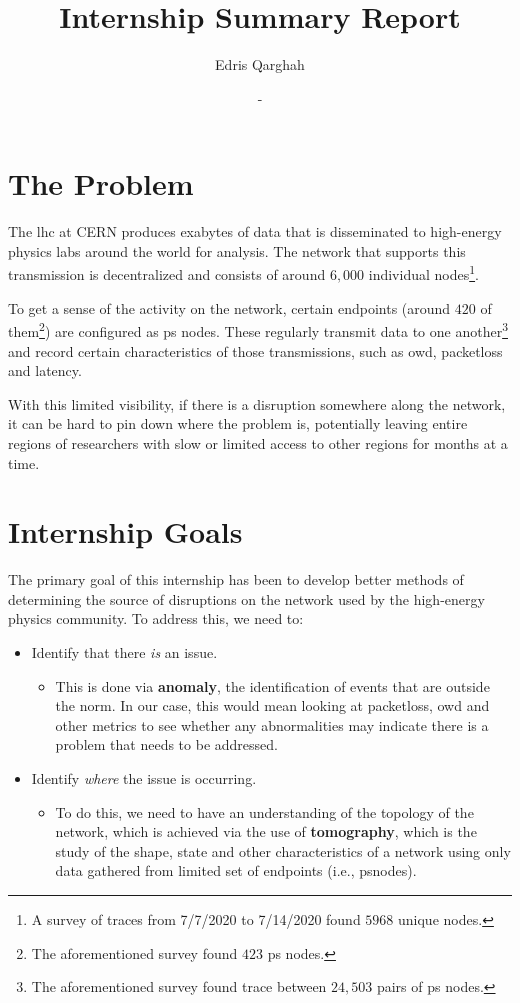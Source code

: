 \documentclass{finalreport}
\title{Internship Summary Report}
\author{Edris Qarghah}
\date{\DTMusedate{startdate}-\DTMusedate{enddate}}
\begin{document}
\maketitle

\newpage

\section*{The Problem}

The \gls{lhc} at CERN produces exabytes of data that is disseminated to high-energy physics labs around the world for analysis. The network that supports this transmission is decentralized and consists of around $6,000$ individual \glspl{node}\footnote{A survey of \glspl{trace} from 7/7/2020 to 7/14/2020 found $5968$ unique \glspl{node}.}.

To get a sense of the activity on the network, certain \glspl{endpoint} (around $420$ of them\footnote{The aforementioned survey found $423$ \gls{ps} nodes.}) are configured as \gls{ps} nodes. These regularly transmit data to one another\footnote{The aforementioned survey found \gls{trace} between $24,503$ pairs of \gls{ps} nodes.} and record certain characteristics of those transmissions, such as \gls{owd}, \gls{packetloss} and \gls{latency}. 

With this limited visibility, if there is a disruption somewhere along the network, it can be hard to pin down where the problem is, potentially leaving entire regions of researchers with slow or limited access to other regions for months at a time.


\section*{Internship Goals}

The primary goal of this internship has been to develop better methods of determining the source of disruptions on the network used by the high-energy physics community. To address this, we need to:

\begin{itemize}
	\item Identify that there \textit{is} an issue. 
	\begin{itemize}
		\item This is done via \textbf{\gls{anomaly}}, the identification of events that are outside the norm. In our case, this would mean looking at \gls{packetloss}, \gls{owd} and other metrics to see whether any abnormalities may indicate there is a problem that needs to be addressed.
	\end{itemize}
	\item Identify \textit{where} the issue is occurring. 
	\begin{itemize}
		\item To do this, we need to have an understanding of the topology of the network, which is achieved via the use of \textbf{\gls{tomography}}, which is the study of the shape, state and other characteristics of a network using only data gathered from limited set of \glspl{endpoint} (i.e., \glspl{psnode}).
	\end{itemize}
	
\end{itemize}
\end{document}
